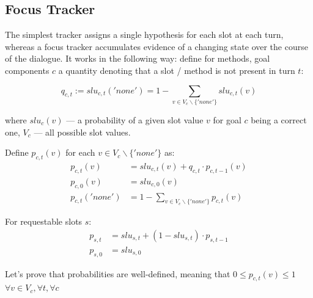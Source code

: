 \documentclass[12pt,titlepage,a4paper]{article}
\begin{document}
\subsection{Focus Tracker}

The simplest tracker assigns a single hypothesis for each slot at each turn, whereas a focus tracker accumulates evidence of a changing state over the course of the dialogue. It works in the following way: define for methods, goal components $c$ a quantity denoting that a slot / method is not present in turn $t$:

\begin{equation}
    \label{eqn:q_c_t}
    q_{c,t} := slu_{c,t}('none') = 1 - \sum_{v \in V_c \backslash \{'none'\}}slu_{c,t}(v)
\end{equation}

\noindent where $slu_c(v)$ --- a probability of a given slot value $v$ for goal $c$ be\-ing a correct one, $V_c$ --- all possible slot values.

Define $p_{c,t}(v)$ for each $v \in V_c \backslash \{'none'\}$ as: 
\begin{align}
    \label{eqn:p_c_t}
    p_{c,t}(v) &=slu_{c,t}(v) + q_{c,t} \cdot p_{c,t-1}(v) \\
    \label{eqn:p_c_0}
    p_{c,0}(v) &= slu_{c,0}(v) \\
    \label{eqn:p_c_t_none}
    p_{c,t}('none') &= 1 - \sum_{v \in V_c \backslash \{'none'\}}p_{c,t}(v)
\end{align}

For requestable slots $s$: 
\begin{align}
    \label{eqn:p_s_t}
    p_{s,t} &= slu_{s,t} + (1 - slu_{s, t})\cdot p_{s,t-1} \\
    \label{eqn:p_s_0}
    p_{s,0} &= slu_{s,0}
\end{align}

Let's prove that probabilities are well-defined, meaning that $0 \leq p_{c,t}(v) \leq 1$ $\forall v \in V_c, \forall t, \forall c$
\end{document}
